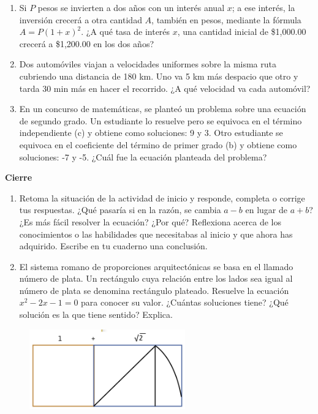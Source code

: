 \documentclass[11pt]{book}
\begin{document}
\begin{enumerate}
    \item Si $P$ pesos se invierten a dos años con un interés anual $x$; a ese interés, la inversión
          crecerá a otra cantidad $A$, también en pesos, mediante la fórmula $A = P(1 + x)^2$.
          ¿A qué tasa de interés $x$, una cantidad inicial de \$1,000.00 crecerá a \$1,200.00 en los dos años?

    \item Dos automóviles viajan a velocidades uniformes sobre la misma ruta cubriendo una distancia de 180 km. Uno va 5 km más despacio que otro y tarda 30 min más en hacer el recorrido. ¿A qué velocidad va cada automóvil?

    \item En un concurso de matemáticas, se planteó un problema sobre una ecuación de segundo grado. Un estudiante lo resuelve pero se equivoca en el término independiente (c) y obtiene como soluciones: 9 y 3. Otro estudiante se equivoca en el coeficiente del término de primer grado (b) y obtiene como soluciones: -7 y -5. ¿Cuál fue la ecuación planteada del problema?


\end{enumerate}

\begin{boxK}
    \begin{center}\textbf{Cierre}\end{center}

    \begin{enumerate}
        \item Retoma la situación de la actividad de inicio y responde, completa o corrige tus respuestas. ¿Qué pasaría si en la razón, se cambia $a - b$ en lugar de $a + b$?
              ¿Es más fácil resolver la ecuación? ¿Por qué?
              Reflexiona acerca de los conocimientos o las habilidades que necesitabas al inicio y que ahora has adquirido. Escribe en tu cuaderno una conclusión.
        \item El sistema romano de proporciones arquitectónicas se basa
              en el llamado número de plata. Un rectángulo cuya relación entre los lados sea igual al número de plata se denomina
              rectángulo plateado. Resuelve la ecuación $x^2 - 2x - 1 = 0$ para conocer su valor. ¿Cuántas soluciones tiene? ¿Qué solución es la que tiene sentido? Explica.
    \end{enumerate}

    \begin{figure}[H]
        \centering
        \includegraphics[width=0.6\textwidth]{plata.png}
        \label{fig:plata}
    \end{figure}

\end{boxK}
\end{document}
